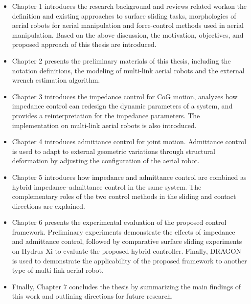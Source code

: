 \begin{itemize}
  \item Chapter 1 introduces the research background and reviews related workon the definition and existing approaches to surface sliding tasks, morphologies of aerial robots for aerial manipulation and force-control methods used in aerial manipulation. Based on the above discussion, the motivation, objectives, and proposed approach of this thesis are introduced.
  \item Chapter 2 presents the preliminary materials of this thesis, including the notation definitions, the modeling of multi-link aerial robots and the external wrench estimation algorithm.
  \item Chapter 3 introduces the impedance control for CoG motion, analyzes how impedance control can redesign the dynamic parameters of a system, and provides a reinterpretation for the impedance parameters. The implementation on multi-link aerial robots is also introduced.
  \item Chapter 4 introduces admittance control for joint motion. Admittance control is used to adapt to external geometric variations through structural deformation by adjusting the configuration of the aerial robot.
  \item Chapter 5 introduces how impedance and admittance control are combined as hybrid impedance--admittance control in the same system. The complementary roles of the two control methods in the sliding and contact directions are explained.
  \item Chapter 6 presents the experimental evaluation of the proposed control framework. Preliminary experiments demonstrate the effects of impedance and admittance control, followed by comparative surface sliding experiments on Hydrus Xi to evaluate the proposed hybrid controller. Finally, DRAGON is used to demonstrate the applicability of the proposed framework to another type of multi-link aerial robot.
  \item Finally, Chapter 7 concludes the thesis by summarizing the main findings of this work and outlining directions for future research.
\end{itemize}


